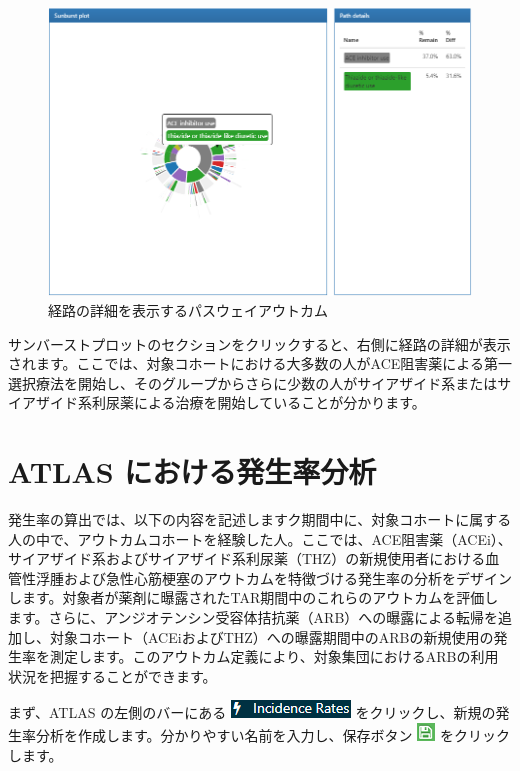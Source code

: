 \documentclass[
  11pt]{book}
\theoremstyle{definition}
\theoremstyle{definition}
\theoremstyle{definition}
\theoremstyle{definition}
\theoremstyle{remark}
\begin{document}
\begin{figure}

{\centering \includegraphics[width=1\linewidth]{images/Characterization/atlasPathwaysResultsPathDetails} 

}

\caption{経路の詳細を表示するパスウェイアウトカム}\label{fig:atlasPathwaysResultsPathDetails}
\end{figure}

サンバーストプロットのセクションをクリックすると、右側に経路の詳細が表示されます。ここでは、対象コホートにおける大多数の人がACE阻害薬による第一選択療法を開始し、そのグループからさらに少数の人がサイアザイド系またはサイアザイド系利尿薬による治療を開始していることが分かります。

\section{ATLAS における発生率分析}\label{atlas-ux306bux304aux3051ux308bux767aux751fux7387ux5206ux6790}

発生率の算出では、以下の内容を記述しますク期間中に、対象コホートに属する人の中で、アウトカムコホートを経験した人。ここでは、ACE阻害薬（ACEi）、サイアザイド系およびサイアザイド系利尿薬（THZ）の新規使用者における血管性浮腫および急性心筋梗塞のアウトカムを特徴づける発生率の分析をデザインします。対象者が薬剤に曝露されたTAR期間中のこれらのアウトカムを評価します。さらに、アンジオテンシン受容体拮抗薬（ARB）への曝露による転帰を追加し、対象コホート（ACEiおよびTHZ）への曝露期間中のARBの新規使用の発生率を測定します。このアウトカム定義により、対象集団におけるARBの利用状況を把握することができます。

まず、ATLAS の左側のバーにある \includegraphics{images/Characterization/atlasIncidenceMenuItem.png} をクリックし、新規の発生率分析を作成します。分かりやすい名前を入力し、保存ボタン \includegraphics{images/PopulationLevelEstimation/save.png} をクリックします。
\end{document}
